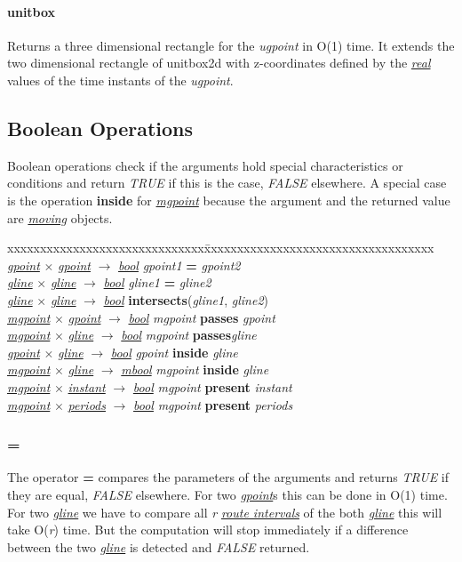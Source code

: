 \documentclass[a4paper]{article}
\newcommand{\op}[1]{\textbf{#1}}
\newcommand{\var}[1]{\textsl{#1}}
\newcommand{\dt}[1]{\textsl{\underline{#1}}}
\newcommand{\true}{\var{TRUE}}
\newcommand{\false}{\var{FALSE}}
\begin{document}
\paragraph{\op{unitbox}}
Returns a three dimensional rectangle for the \var{ugpoint} in O(1) time. It extends the two dimensional rectangle of unitbox2d with z-coordinates defined by the \dt{real} values of the time instants of the \var{ugpoint}.
\subsection{Boolean Operations}
Boolean operations check if the arguments hold special characteristics or conditions and return \true{} if this is the case, \false{} elsewhere. A special case is the operation \op{inside} for \dt{mgpoint} because the argument and the returned value are \dt{moving} objects.
\begin{tabbing}
xxxxxxxxxxxxxxxxxxxxxxxxxxxxxx\=xxxxxxxxxxxxxxxxxxxxxxxxxxxxxxxxxxx\kill
\dt{gpoint} $\times$ \dt{gpoint} $\rightarrow$ \dt{bool} \> \var{gpoint1} \op{=} \var{gpoint2} \\
\dt{gline} $\times$ \dt{gline} $\rightarrow$ \dt{bool} \> \var{gline1} \op{=} \var{gline2} \\
\dt{gline} $\times$ \dt{gline} $\rightarrow$ \dt{bool} \> \op{intersects}(\var{gline1}, \var{gline2})\\
\dt{mgpoint} $\times$ \dt{gpoint} $\rightarrow$ \dt{bool} \> \var{mgpoint} \op{passes} \var{gpoint}\\
\dt{mgpoint} $\times$ \dt{gline} $\rightarrow$ \dt{bool} \> \var{mgpoint} \op{passes}\var{gline}\\
\dt{gpoint} $\times$ \dt{gline} $\rightarrow$ \dt{bool} \> \var{gpoint} \op{inside} \var{gline}\\
\dt{mgpoint} $\times$ \dt{gline} $\rightarrow$ \dt{mbool} \> \var{mgpoint} \op{inside} \var{gline}\\
\dt{mgpoint} $\times$ \dt{instant} $\rightarrow$ \dt{bool} \> \var{mgpoint} \op{present} \var{instant}\\
\dt{mgpoint} $\times$ \dt{periods} $\rightarrow$ \dt{bool} \> \var{mgpoint} \op{present} \var{periods}\\
\end{tabbing}
\subsubsection{\op{=}}
The operator \op{=} compares the parameters of the arguments and returns \true{} if they are equal, \false{} elsewhere. For two \dt{gpoint}s this can be done in O(1) time. For two \dt{gline} we have to compare all \var{r} \dt{route intervals} of the both \dt{gline} this will take O(\var{r}) time. But the computation will stop immediately if a difference between the two \dt{gline} is detected and \false{} returned.
\end{document}
